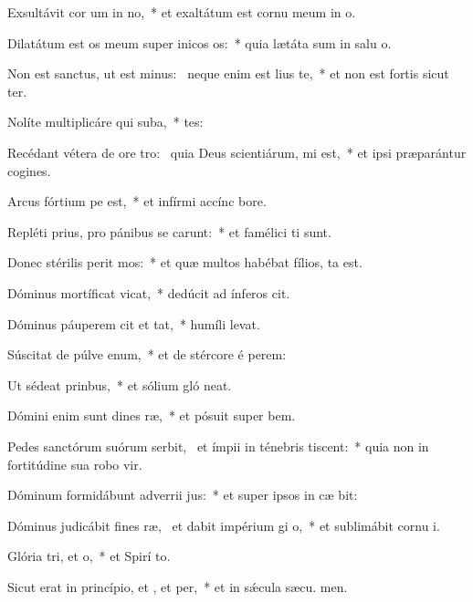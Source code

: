 \item Exsultávit cor um in no,~* et exaltátum est cornu meum in  o.
\item Dilatátum est os meum super inicos os:~* quia lætáta sum in salu o.
\item Non est sanctus, ut est minus:~\pscross{} neque enim est lius  te,~* et non est fortis sicut  ter.
\item Nolíte multiplicáre qui suba,~* tes:
\item Recédant vétera de ore tro:~\pscross{} quia Deus scientiárum, mi est,~* et ipsi præparántur cogines.
\item Arcus fórtium pe est,~* et infírmi accínc  bore.
\item Repléti prius, pro pánibus se carunt:~* et famélici ti sunt.
\item Donec stérilis perit mos:~* et quæ multos habébat fílios, ta est.
\item Dóminus mortíficat  vicat,~* dedúcit ad ínferos  cit.
\item Dóminus páuperem cit et tat,~* humíli  levat.
\item Súscitat de púlve enum,~* et de stércore é perem:
\item Ut sédeat  prinbus,~* et sólium gló neat.
\item Dómini enim sunt dines ræ,~* et pósuit super  bem.
\item Pedes sanctórum suórum serbit,~\pscross{} et ímpii in ténebris tiscent:~* quia non in fortitúdine sua robo vir.
\item Dóminum formidábunt adverrii jus:~* et super ipsos in cæ bit:
\item Dóminus judicábit fines ræ,~\pscross{} et dabit impérium gi o,~* et sublimábit cornu  i.
\item Glória tri, et o,~* et Spirí to.
\item Sicut erat in princípio, et , et per,~* et in sǽcula sæcu. men.
